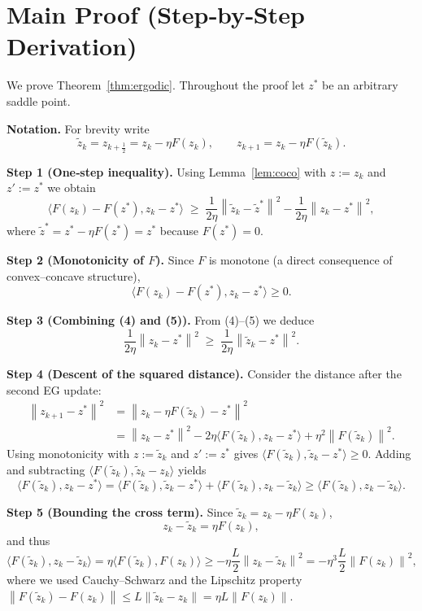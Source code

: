 \documentclass{article}
\newcommand{\norm}[1]{\left\lVert#1\right\rVert}
\begin{document}
\section*{Main Proof (Step‑by‑Step Derivation)}
We prove Theorem~\ref{thm:ergodic}. Throughout the proof let \(z^{*}\) be an arbitrary saddle point.

\bigskip
\noindent\textbf{Notation.} For brevity write
\[
\tilde z_{k}=z_{k+\frac12}=z_{k}-\eta F(z_{k}),\qquad
z_{k+1}=z_{k}-\eta F(\tilde z_{k}).
\]

\bigskip
\noindent\textbf{Step 1 (One‑step inequality).}
Using Lemma~\ref{lem:coco} with \(z:=z_{k}\) and \(z':=z^{*}\) we obtain
\[
\langle F(z_{k})-F(z^{*}),z_{k}-z^{*}\rangle
\;\ge\;
\frac{1}{2\eta}\norm{\tilde z_{k}-\tilde z^{*}}^{2}
-\frac{1}{2\eta}\norm{z_{k}-z^{*}}^{2},
\tag{4}
\]
where \(\tilde z^{*}=z^{*}-\eta F(z^{*})=z^{*}\) because \(F(z^{*})=0\).

\bigskip
\noindent\textbf{Step 2 (Monotonicity of \(F\)).}
Since \(F\) is monotone (a direct consequence of convex–concave structure),
\[
\langle F(z_{k})-F(z^{*}),z_{k}-z^{*}\rangle\ge 0.
\tag{5}
\]

\bigskip
\noindent\textbf{Step 3 (Combining (4) and (5)).}
From (4)–(5) we deduce
\[
\frac{1}{2\eta}\norm{z_{k}-z^{*}}^{2}
\;\ge\;
\frac{1}{2\eta}\norm{\tilde z_{k}-z^{*}}^{2}.
\tag{6}
\]

\bigskip
\noindent\textbf{Step 4 (Descent of the squared distance).}
Consider the distance after the second EG update:
\[
\begin{aligned}
\norm{z_{k+1}-z^{*}}^{2}
&=\norm{z_{k}-\eta F(\tilde z_{k})-z^{*}}^{2}\\
&=\norm{z_{k}-z^{*}}^{2}
-2\eta\langle F(\tilde z_{k}),z_{k}-z^{*}\rangle
+\eta^{2}\norm{F(\tilde z_{k})}^{2}.
\end{aligned}
\tag{7}
\]
Using monotonicity with \(z:=\tilde z_{k}\) and \(z':=z^{*}\) gives
\(\langle F(\tilde z_{k}),\tilde z_{k}-z^{*}\rangle\ge 0\).  Adding and subtracting
\(\langle F(\tilde z_{k}),\tilde z_{k}-z_{k}\rangle\) yields
\[
\langle F(\tilde z_{k}),z_{k}-z^{*}\rangle
= \langle F(\tilde z_{k}),\tilde z_{k}-z^{*}\rangle
   +\langle F(\tilde z_{k}),z_{k}-\tilde z_{k}\rangle
\ge \langle F(\tilde z_{k}),z_{k}-\tilde z_{k}\rangle .
\tag{8}
\]

\bigskip
\noindent\textbf{Step 5 (Bounding the cross term).}
Since \(\tilde z_{k}=z_{k}-\eta F(z_{k})\),
\[
z_{k}-\tilde z_{k}=\eta F(z_{k}),
\]
and thus
\[
\langle F(\tilde z_{k}),z_{k}-\tilde z_{k}\rangle
= \eta\langle F(\tilde z_{k}),F(z_{k})\rangle
\ge -\eta\frac{L}{2}\norm{z_{k}-\tilde z_{k}}^{2}
= -\eta^{3}\frac{L}{2}\norm{F(z_{k})}^{2},
\tag{9}
\]
where we used Cauchy–Schwarz and the Lipschitz property
\(\norm{F(\tilde z_{k})-F(z_{k})}\le L\norm{\tilde z_{k}-z_{k}}=\eta L\norm{F(z_{k})}\).
\end{document}
